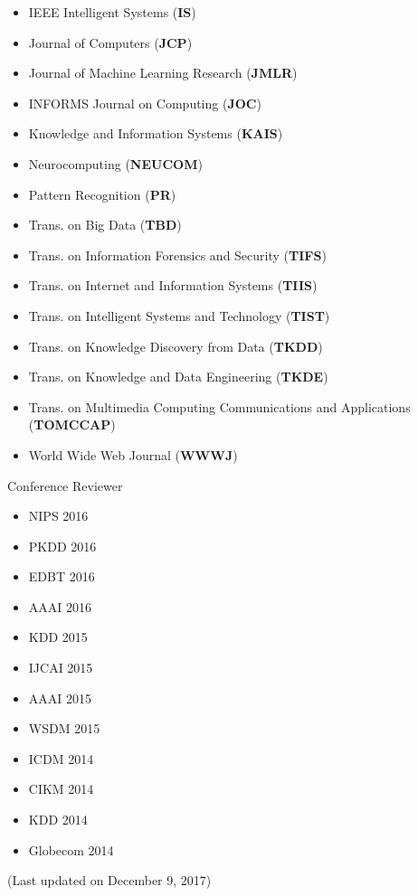 \documentclass[margin, 9pt]{res}
\begin{document}
\begin{resume}
\begin{itemize}
\item IEEE Intelligent Systems (\textbf{IS})
\item Journal of Computers (\textbf{JCP})
\item Journal of Machine Learning Research (\textbf{JMLR})
\item INFORMS Journal on Computing (\textbf{JOC})
\item Knowledge and Information Systems (\textbf{KAIS})
\item Neurocomputing (\textbf{NEUCOM})
\item Pattern Recognition (\textbf{PR})
\item Trans. on Big Data (\textbf{TBD})
\item Trans. on Information Forensics and Security (\textbf{TIFS})
\item Trans. on Internet and Information Systems (\textbf{TIIS})
\item Trans. on Intelligent Systems and Technology (\textbf{TIST})
\item Trans. on Knowledge Discovery from Data (\textbf{TKDD})
\item Trans. on Knowledge and Data Engineering (\textbf{TKDE})
\item Trans. on Multimedia Computing Communications and Applications (\textbf{TOMCCAP})
\item World Wide Web Journal (\textbf{WWWJ})
\end{itemize}
\vspace{-0.1in}
{Conference Reviewer}
\vspace{-0.15in}
\begin{multicols}{3}
\begin{itemize}
\item NIPS 2016
\item PKDD 2016
\item EDBT 2016
\item AAAI 2016
\item KDD 2015
\item IJCAI 2015
\item AAAI 2015
\item WSDM 2015
\item ICDM 2014
\item CIKM 2014
\item KDD 2014
\item Globecom 2014
\end{itemize}
\end{multicols}

(Last updated on December 9, 2017)
\end{resume}
\end{document}
